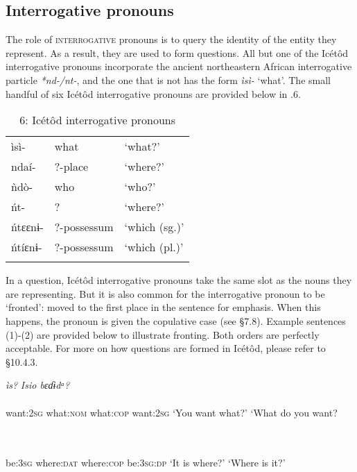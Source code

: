 \subsection{Interrogative pronouns}


The role of \textsc{interrogative} pronouns is to query the identity of the entity they represent. As a result, they are used to form questions. All but one of the Icétôd interrogative pronouns incorporate the ancient northeastern African interrogative particle \textit{*nd-/nt-}, and the one that is not has the form \textit{ìsì-} ‘what’. The small handful of six Icétôd interrogative pronouns are provided below in .6. 


\begin{table}
\caption{6: Icétôd interrogative pronouns}
\label{tab:5}


\begin{tabularx}{\textwidth}{XXX}
\lsptoprule

ìsì- & what & ‘what?’\\
ndaí- & ?-place & ‘where?’\\
ǹdò- & who & ‘who?’\\
ńt- & ? & ‘where?’\\
ńtɛɛnɨ- & ?-possessum & ‘which (sg.)’\\
ńtíɛnɨ- & ?-possessum & ‘which (pl.)’\\
\lspbottomrule
\end{tabularx}
\end{table}
In a question, Icétôd interrogative pronouns take the same slot as the nouns they are representing. But it is also common for the interrogative pronoun to be ‘fronted’: moved to the first place in the sentence for emphasis. When this happens, the pronoun is given the copulative case (see §7.8). Example sentences (1)-(2) are provided below to illustrate fronting. Both orders are perfectly acceptable. For more on how questions are formed in Icétôd, please refer to §10.4.3.




\ea\label{ex:}
   \textit{ìs}\textit{?}      \textit{Isi}\textit{o     bɛɗɨdᵃ?} \\
    \\
want:\textsc{2sg}   what:\textsc{nom}    what:\textsc{cop}   want:2\textsc{sg}
\glt ‘You want what?’      ‘What do you want? 
\z




\ea\label{ex:}
 \\
    \\
be:\textsc{3sg}   where:\textsc{dat}    where:\textsc{cop}   be:\textsc{3sg:dp}
\glt ‘It is where?’      ‘Where is it?’ 
\z






